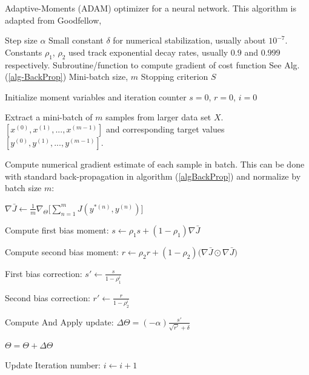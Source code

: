 \documentclass[12pt,letterpaper]{article}
\begin{document}
\begin{algorithm}[H]
\caption{Adaptive-Moments (ADAM) optimizer for a neural network. This algorithm is adapted from Goodfellow, \cite{Goodfellow}}
\label{alg-ADAM}

\begin{algorithmic}
\REQUIRE Step size $\alpha$
\REQUIRE Small constant $\delta$ for numerical stabilization, usually about $10^{-7}$.
\REQUIRE Constants $\rho_1$, $\rho_2$ used track exponential decay rates, usually $0.9$ and $0.999$ respectively.
\REQUIRE Subroutine/function to compute gradient of cost function See Alg. (\ref{alg-BackProp})
\REQUIRE Mini-batch size, $m$
\REQUIRE Stopping criterion $S$

Initialize moment variables and iteration counter $s = 0$, $r = 0$, $i = 0$ \\

	\item Extract a mini-batch of $m$ samples from larger data set $X$. $[x^{(0)},x^{(1)},...,x^{(m-1)}]$ and corresponding target values 
	$[y^{(0)},y^{(1)},...,y^{(m-1)}]$.
	\item Compute numerical gradient estimate of each sample in batch. This can be done with standard back-propagation in algorithm (\ref{algBackProp}) and 			 	normalize by batch size $m$:
	\item $\nabla \bar{J} \leftarrow \frac{1}{m} \nabla_{\Theta} \Big[\sum_{n=1}^{m} J(y^{*(n)},y^{(n)}) \Big]$
	
	\item Compute first bias moment: $s \leftarrow \rho_1 s + (1 - \rho_1) \nabla \bar{J}$
	\item Compute second bias moment: $r \leftarrow \rho_2 r + (1 - \rho_2) \big( \nabla \bar{J} \odot \nabla \bar{J} \big)$
	\item First bias correction: $s' \leftarrow \frac{s}{1 - \rho_1^i}$
	\item Second bias correction: $r' \leftarrow \frac{r}{1 - \rho_2^i}$
	
	\item Compute And Apply update:	$\Delta \Theta = (-\alpha) \frac{s'}{\sqrt{r'} + \delta}$
	\item $\Theta = \Theta + \Delta \Theta$	
	\item Update Iteration number: $i \leftarrow i + 1$
\ENDWHILE

\end{algorithmic}
\end{algorithm}
\end{document}
